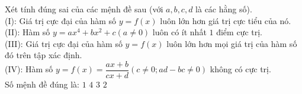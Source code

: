 	\begin{ex}%
		Xét tính đúng sai của các mệnh đề sau (với $a, b, c, d$ là các hằng số).\\
		(I): Giá trị cực đại của hàm số $y=f(x)$ luôn lớn hơn giá trị cực tiểu của nó.\\
		(II): Hàm số $y=ax^4+bx^2+c \left(a\ne 0\right)$ luôn có ít nhất $1$ điểm cực trị.\\
		(III): Giá trị cực đại của hàm số $y=f(x)$ luôn lớn hơn mọi giá trị của hàm số đó trên tập xác định.\\
		(IV): Hàm số $y=f(x)=\dfrac{ax+b}{cx+d} \left(c\ne 0; ad-bc\ne 0\right)$ không có cực trị.\\
		Số mệnh đề đúng là:
		\choice
		{$1$}
		{$4$}
		{$3$}
		{\True $2$}
	\end{ex}
